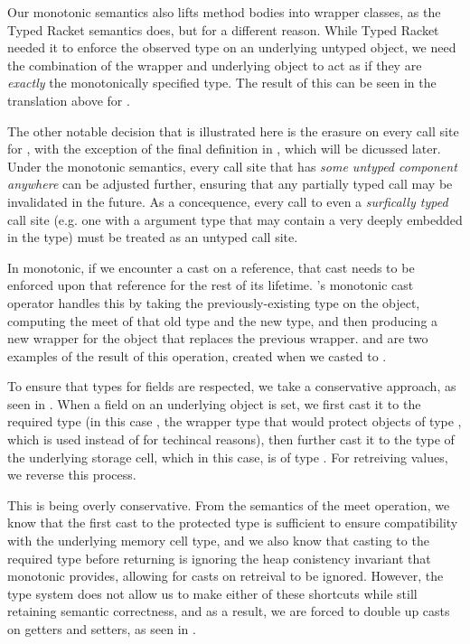 \documentclass[a4paper,USenglish]{tex/lipics-v2016}
\begin{document}
Our monotonic semantics also lifts method bodies into wrapper classes, as the
Typed Racket semantics does, but for a different reason. While Typed Racket
needed it to enforce the observed type on an underlying untyped object, we need
the combination of the wrapper and underlying object to act as if they are
\emph{exactly} the monotonically specified type. The result of this can be seen
in the translation above for \m.

The other notable decision that is illustrated here is the erasure on every call
site for \m, with the exception of the final definition in , which will
be dicussed later. Under the monotonic semantics, every call site that has
\emph{some untyped component anywhere} can be adjusted further, ensuring that
any partially typed call may be invalidated in the future. As a concequence,
every call to even a \emph{surfically typed} call site (e.g. one with a argument
type that may contain a \any very deeply embedded in the type) must be treated
as an untyped call site.

In monotonic, if we encounter a cast on a reference, that cast needs to be
enforced upon that reference for the rest of its lifetime. \kafka's monotonic
cast operator handles this by taking the previously-existing type on the object,
computing the meet of that old type and the new type, and then producing a new
wrapper for the object that replaces the previous wrapper.  and 
are two examples of the result of this operation, created when we casted \a to
.

To ensure that types for fields are respected, we take a conservative approach, 
as seen in . When a field on an underlying object is set, we first cast
it to the required type (in this case , the wrapper type that would 
protect objects of type , which is used instead of  for techincal
reasons), then further cast it to the type of the underlying storage cell, which
in this case, is of type \any. For retreiving values, we reverse this process.

This is being overly conservative. From the semantics of the meet operation, we
know that the first cast to the protected type is sufficient to ensure 
compatibility with the underlying memory cell type, and we also know that casting
to the required type before returning is ignoring the heap conistency invariant 
that monotonic provides, allowing for casts on retreival to be ignored. However,
the \kafka type system does not allow us to make either of these shortcuts while
still retaining semantic correctness, and as a result, we are forced to double 
up casts on getters and setters, as seen in .
\end{document}
